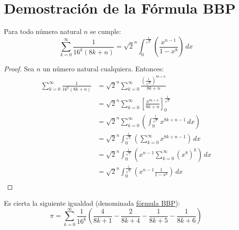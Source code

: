 
\section{Demostración de la Fórmula BBP}

\begin{lemma}
  Para todo número natural $n$ se cumple:
  \begin{equation*}
    \sum_{k=0}^{\infty}\frac{1}{16^{k}(8k+n)}
    =\sqrt{2}^{n}\int_{0}^{\frac{1}{\sqrt{2}}}
    \left(\frac{x^{n-1}}{1-x^{8}}\right)
    \,dx
  \end{equation*}
\end{lemma}

\begin{proof}
  Sea $n$ un número natural cualquiera. Entonces:
  \begin{align*}
    \sum_{k=0}^{\infty}\frac{1}{16^{k}(8k+n)}
         &=\sqrt{2}^{n}\sum_{k=0}^{\infty}
             \frac{\left(\frac{1}{\sqrt{2}}\right)^{8k+n}}{8k+n}\\
         &=\sqrt{2}^{n}\sum_{k=0}^{\infty}
             \left[\frac{x^{8k+n}}{8k+n}\right]_{0}^{\frac{1}{\sqrt{2}}}\\
         &=\sqrt{2}^{n}\sum_{k=0}^{\infty}
           \left(
             \int _{0}^{\frac{1}{\sqrt{2}}}x^{8k+n-1}\,dx
           \right)\\
         &=\sqrt{2}^{n}\int _{0}^{\frac{1}{\sqrt{2}}}
           \left(\sum_{k=0}^{\infty}
                  x^{8k+n-1}
           \right)\,dx\\
         &=\sqrt{2}^{n}\int _{0}^{\frac{1}{\sqrt{2}}}
           \left(x^{n-1}\sum_{k=0}^{\infty}
                  (x^{8})^{k}
           \right)\,dx\\
             &=\sqrt{2}^{n}\int _{0}^{\frac{1}{\sqrt{2}}}
           \left(x^{n-1}\frac{1}{1-x^{8}}
           \right)\,dx\\
  \end{align*}
  
\end{proof}

\begin{theorem}
  Es cierta la siguiente igualdad (denominada
  \hyperref[eq:bbp]{fórmula BBP}):
  \begin{equation}
    \label{eq:bbp}
        \pi = \sum_{k=0}^{\infty}\frac{1}{16^{k}}
    \left(
      \frac{4}{8k+1}
      -\frac{2}{8k+4}
      -\frac{1}{8k+5}
      -\frac{1}{8k+6}
    \right) \nonumber
  \end{equation}
\end{theorem}

